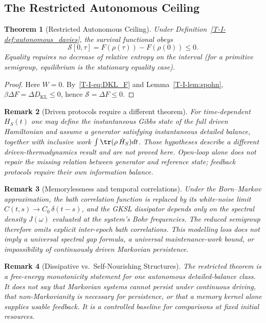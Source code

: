 \documentclass[12pt,a4paper,openany]{book}
\newtheorem{theorem}{Theorem}[chapter]
\newtheorem{remark}[theorem]{Remark}
\begin{document}
\subsection{The Restricted Autonomous Ceiling}

\begin{theorem}[Restricted Autonomous Ceiling]
\label{T-I-thm:autonomous_ceiling}
Under Definition~\ref{T-I-def:autonomous_davies}, the survival functional
obeys
\begin{equation}
\label{T-I-eq:ceiling}
\mathcal S[0,\tau]=F(\rho(\tau))-F(\rho(0))\leq0.
\end{equation}
Equality requires no decrease of relative entropy on the interval
(for a primitive semigroup, equilibrium is the stationary equality case).
\end{theorem}

\begin{proof}
Here $W=0$.  By~\eqref{T-I-eq:DKL_F} and Lemma~\ref{T-I-lem:spohn},
$\beta\Delta F=\Delta D_{\mathrm{KL}}\leq0$, hence
$\mathcal S=\Delta F\leq0$.
\end{proof}

\begin{remark}[Driven protocols require a different theorem]
\label{T-I-rem:driven_protocol}
For time-dependent $H_S(t)$ one may define the instantaneous Gibbs
state of the full driven Hamiltonian and assume a generator satisfying
instantaneous detailed balance, together with inclusive work
$\int\tr(\rho\,\dot H_S)dt$.  Those hypotheses describe a different
driven-thermodynamics result and are not proved here.  Open-loop alone
does not repair the missing relation between generator and reference
state; feedback protocols require their own information balance.
\end{remark}

\begin{remark}[Memorylessness and temporal correlations]
\label{T-I-rem:temporal_blindness}
Under the Born--Markov approximation, the bath correlation
function is replaced by its white-noise limit
$C(t,s) \to C_0\,\delta(t-s)$, and the GKSL dissipator depends
only on the spectral density $J(\omega)$ evaluated at the
system's Bohr frequencies.
The reduced semigroup therefore omits explicit inter-epoch bath
correlations.  This modelling loss does not imply a universal spectral
gap formula, a universal maintenance-work bound, or impossibility of
continuously driven Markovian persistence.
\end{remark}

\begin{remark}[Dissipative vs.\ Self-Nourishing Structures]
\label{T-I-rem:ceiling_physics}
The restricted theorem is a free-energy monotonicity statement for one
autonomous detailed-balance class.  It does not say that Markovian
systems cannot persist under continuous driving, that non-Markovianity
is necessary for persistence, or that a memory kernel alone supplies
usable feedback.  It is a controlled baseline for comparisons at fixed
initial resources.
\end{remark}
\end{document}
